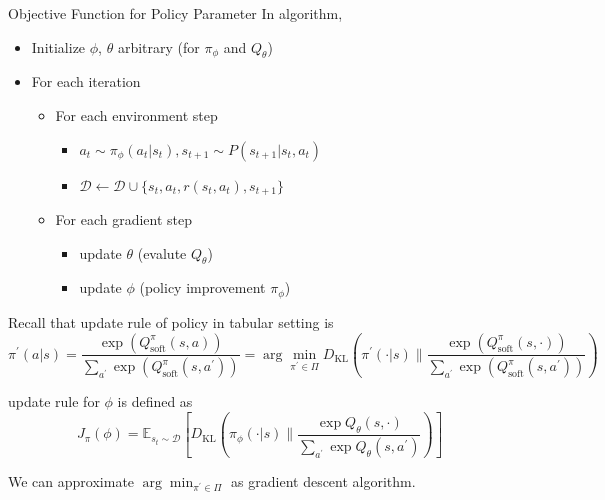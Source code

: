 \documentclass[8pt]{beamer}
\begin{document}
\begin{frame}{Objective Function for Policy Parameter}
    In algorithm, 
    \begin{itemize}
        \item Initialize $\phi$, $\theta$ arbitrary (for $\pi_\phi$ and $Q_\theta$)
        \item For each iteration
        \begin{itemize}
            \item For each environment step
            \begin{itemize}
                \item $a_t \sim \pi_\phi(a_t | s_t), s_{t+1} \sim P(s_{t+1}|s_t, a_t)$
                \item $\mathcal{D} \leftarrow \mathcal{D} \cup \{s_t, a_t, r(s_t, a_t), s_{t+1}\}$            
            \end{itemize}
            \item For each gradient step
            \begin{itemize}
                \item update $\theta$ (evalute $Q_\theta$)
                \item update $\phi$  (policy improvement $\pi_\phi$)
            \end{itemize}
        \end{itemize}
    \end{itemize}


    Recall that update rule of policy in tabular setting is
    \[
        \pi^\prime(a|s) = \frac{\exp{(Q^\pi_\text{soft} (s, a))}}{\sum_{a^\prime} \exp{(Q^\pi_\text{soft} (s, a^\prime))}} = \arg \min_{\pi^\prime \in \Pi} D_\text{KL} \left( \pi^\prime (\cdot|s) \parallel \frac{\exp{(Q^\pi_\text{soft} (s, \cdot))}}{\sum_{a^\prime} \exp{(Q^\pi_\text{soft} (s, a^\prime))}}  \right)
    \]

    update rule for $\phi$ is defined as 
    \[
        J_\pi (\phi) = \mathbb{E}_{s_t \sim \mathcal{D}}\left[D_\text{KL} \left( \pi_\phi (\cdot | s) \parallel \frac{\exp{Q_\theta}(s, \cdot)}{\sum_{a^\prime} \exp{Q_\theta (s, a^\prime)}} \right)\right]
    \]

    We can approximate $\arg \min_{\pi^\prime \in \Pi}$ as gradient descent algorithm.
\end{frame}
\end{document}
